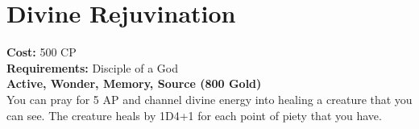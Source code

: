 \section{Divine Rejuvination}\label{wonder:divineRejuvination}
\textbf{Cost:} 500 CP\\
\textbf{Requirements:} Disciple of a God\\
\textbf{Active, Wonder, Memory, Source (800 Gold)}\\
You can pray for 5 AP and channel divine energy into healing a creature that you can see.
The creature heals by 1D4+1 for each point of piety that you have.\\
\\